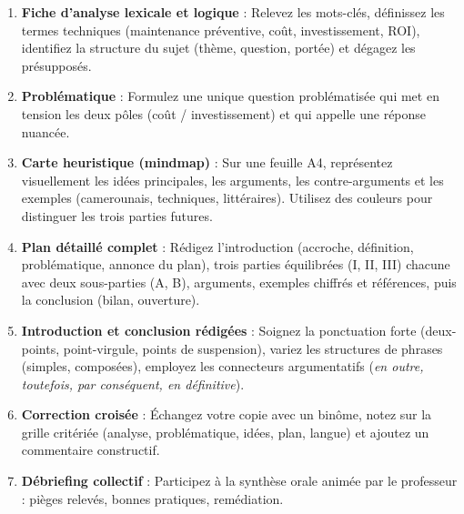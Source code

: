 \documentclass[11pt]{article}
\newcounter{popsec}
\newcounter{popsub}
\newcommand{\courssub}[1]{%
  \stepcounter{popsub}%
  \par\vspace{9pt}\noindent{\popxbold\fontsize{11.5}{13}\selectfont\color{popink}{\color{poporange}\thepopsec.\thepopsub}\hspace{6pt}#1}\par\nopagebreak\vspace{4pt}
}
\begin{document}
\courssub{Consignes}
\begin{enumerate}
    \item \textbf{Fiche d'analyse lexicale et logique} : Relevez les mots-clés, définissez les termes techniques (maintenance préventive, coût, investissement, ROI), identifiez la structure du sujet (thème, question, portée) et dégagez les présupposés.
    \item \textbf{Problématique} : Formulez une unique question problématisée qui met en tension les deux pôles (coût / investissement) et qui appelle une réponse nuancée.
    \item \textbf{Carte heuristique (mindmap)} : Sur une feuille A4, représentez visuellement les idées principales, les arguments, les contre-arguments et les exemples (camerounais, techniques, littéraires). Utilisez des couleurs pour distinguer les trois parties futures.
    \item \textbf{Plan détaillé complet} : Rédigez l'introduction (accroche, définition, problématique, annonce du plan), trois parties équilibrées (I, II, III) chacune avec deux sous-parties (A, B), arguments, exemples chiffrés et références, puis la conclusion (bilan, ouverture).
    \item \textbf{Introduction et conclusion rédigées} : Soignez la ponctuation forte (deux-points, point-virgule, points de suspension), variez les structures de phrases (simples, composées), employez les connecteurs argumentatifs (\emph{en outre, toutefois, par conséquent, en définitive}).
    \item \textbf{Correction croisée} : Échangez votre copie avec un binôme, notez sur la grille critériée (analyse, problématique, idées, plan, langue) et ajoutez un commentaire constructif.
    \item \textbf{Débriefing collectif} : Participez à la synthèse orale animée par le professeur : pièges relevés, bonnes pratiques, remédiation.
\end{enumerate}
\end{document}
